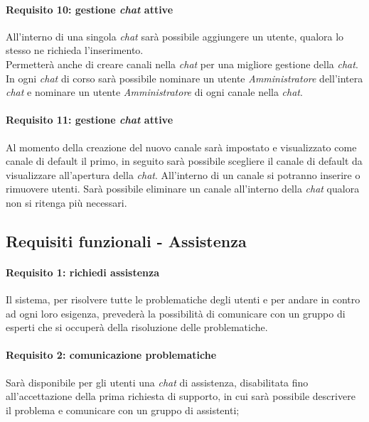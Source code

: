 \paragraph{Requisito 10: gestione \emph{chat} attive\\}
All’interno di una singola \emph{chat} sarà possibile aggiungere un utente, qualora lo stesso ne richieda l’inserimento.\\
Permetterà anche di creare canali nella \emph{chat} per una migliore gestione della \emph{chat}. 
In ogni \emph{chat} di corso sarà possibile nominare un utente \emph{Amministratore} dell’intera \emph{chat} e nominare un utente \emph{Amministratore} di ogni canale nella \emph{chat}.

\paragraph{Requisito 11: gestione \emph{chat} attive\\}
Al momento della creazione del nuovo canale sarà impostato e visualizzato come canale di default il primo, in seguito sarà possibile scegliere il canale di default da visualizzare all’apertura della \emph{chat}. All’interno di un canale si potranno inserire o rimuovere utenti. Sarà possibile eliminare un canale all’interno della \emph{chat} qualora non si ritenga più necessari.

\subsection{Requisiti funzionali - Assistenza}
\paragraph{Requisito 1: richiedi assistenza\\}
Il sistema, per risolvere tutte le problematiche degli utenti e per andare in contro ad ogni loro esigenza, prevederà la possibilità di comunicare con un gruppo di esperti che si occuperà della risoluzione delle problematiche.

\paragraph{Requisito 2: comunicazione problematiche\\}
Sarà disponibile per gli utenti una \emph{chat} di assistenza, disabilitata fino all’accettazione della prima richiesta di supporto, in cui sarà possibile descrivere il problema e comunicare con un gruppo di assistenti;

